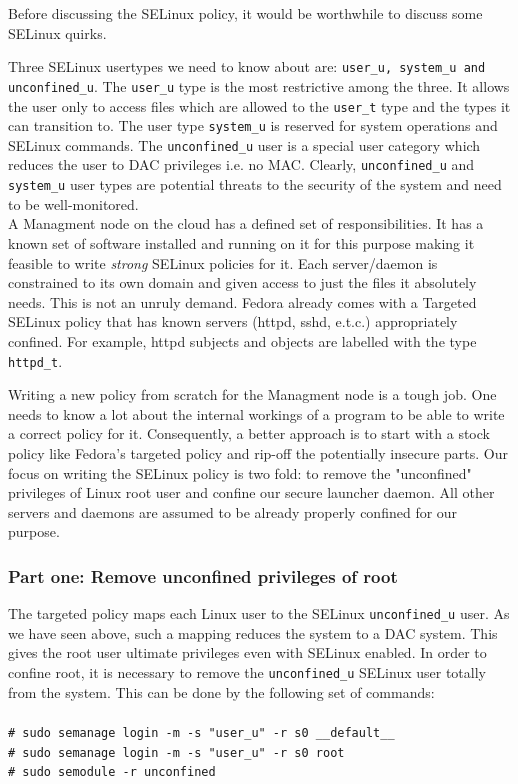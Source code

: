 \documentclass[10pt,twocolumn,pdftex]{article}
\begin{document}
Before discussing the SELinux policy, it would be worthwhile to discuss some SELinux quirks.

Three SELinux usertypes we need to know about are: {\tt user\_u, system\_u and unconfined\_u}. The {\tt user\_u} type is the most restrictive among the three. It allows the user only to access files which are allowed to the {\tt user\_t} type and the types it can transition to. The user type {\tt system\_u} is reserved for system operations and SELinux commands. The {\tt unconfined\_u} user is a special user category which reduces the user to DAC privileges i.e. no MAC. Clearly, {\tt unconfined\_u} and {\tt system\_u} user types are potential threats to the security of the system and need to be well-monitored.\\

A Managment node on the cloud has a defined set of responsibilities. It has a known set of software installed and running on it for this purpose making it feasible to write \emph{strong} SELinux policies for it. Each server/daemon is constrained to its own domain and given access to just the files it absolutely needs. This is not an unruly demand. Fedora already comes with a Targeted SELinux policy that has known servers (httpd, sshd, e.t.c.) appropriately confined. For example, httpd subjects and objects are labelled with the type {\tt httpd\_t}. 

Writing a new policy from scratch for the Managment node is a tough job. One needs to know a lot about the internal workings of a program to be able to write a correct policy for it. Consequently, a better approach is to start with a stock policy like Fedora's targeted policy and rip-off the potentially insecure parts. Our focus on writing the SELinux policy is two fold: to remove the "unconfined" privileges of Linux root user and confine our secure launcher daemon. All other servers and daemons are assumed to be already properly confined for our purpose.

\subsubsection{Part one: Remove unconfined privileges of root}
The targeted policy maps each Linux user to the SELinux {\tt unconfined\_u} user. As we have seen above, such a mapping reduces the system to a DAC system. This gives the root user ultimate privileges even with SELinux enabled. In order to confine root, it is necessary to remove the {\tt unconfined\_u} SELinux user totally from the system. This can be done by the following set of commands:\\ \\
{\tt \# sudo semanage login -m -s "user\_u" -r s0 \_\_default\_\_}\\
{\tt \# sudo semanage login -m -s "user\_u" -r s0 root} \\
{\tt \# sudo semodule -r unconfined}\\
\end{document}
